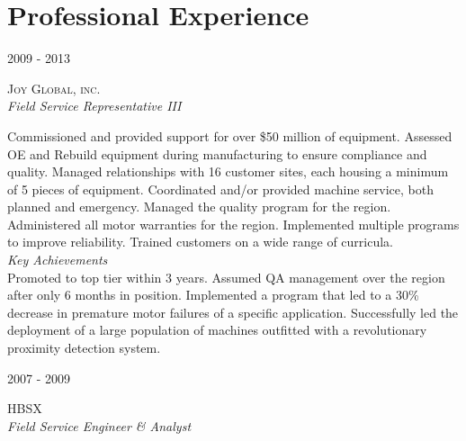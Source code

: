 \documentclass[10pt]{article} %
\begin{document}
\begin{minipage}[t]{0.5\textwidth} %
\vspace{0pt} %
	

\section{Professional Experience} 


{\raggedleft\textsc{2009 - 2013}\par}

{\raggedright\large\textsc{Joy Global, inc.}\\
\textit{Field Service Representative III}\\[5pt]}

\normalsize{Commissioned and provided support for over \$50 million of equipment. Assessed OE and Rebuild equipment during manufacturing to ensure compliance and quality. Managed relationships with 16 customer sites, each housing a minimum of 5 pieces of equipment. Coordinated and/or provided machine service, both planned and emergency. Managed the quality program for the region. Administered all motor warranties for the region. Implemented multiple programs to improve reliability. Trained customers on a wide range of curricula.}\\

\textit{\color{headings}Key Achievements}\\
\normalsize{Promoted to top tier within 3 years. Assumed QA management over the region after only 6 months in position. Implemented a program that led to a 30\% decrease in premature motor failures of a specific application. Successfully led the deployment of a large population of machines outfitted with a revolutionary proximity detection system.}


{\raggedleft\textsc{2007 - 2009}\par}

{\raggedright\large\textsc{HBSX}\\
\textit{Field Service Engineer \& Analyst}\\[5pt]}


\end{minipage}
\end{document}

